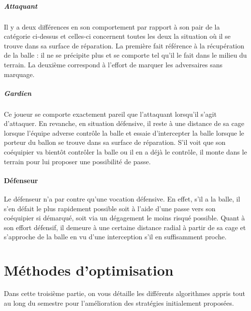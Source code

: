 \documentclass[12pt,a4paper]{article}
\begin{document}
\subsubsection*{Attaquant}
Il y a deux diff\'erences en son comportement par rapport \`a son pair 
de la cat\'egorie ci-dessus et celles-ci concernent toutes les deux la 
situation o\`u il se trouve dans sa surface de r\'eparation. La premi\`ere fait 
r\'ef\'erence \`a la r\'ecup\'eration de la balle : il ne se 
pr\'ecipite plus et se comporte tel qu'il le fait dans le milieu du terrain. La 
deuxi\`eme correspond \`a l'effort de marquer les adversaires sans 
marquage.

\subsubsection*{Gardien}
Ce joueur se comporte exactement pareil que l'attaquant lorsqu'il s'agit 
d'attaquer. En revanche, en situation d\'efensive, il reste \`a une 
distance de sa cage lorsque l'\'equipe adverse contr\^ole la balle et essaie 
d'intercepter la balle lorsque le porteur du ballon se trouve dans sa surface 
de r\'eparation. S'il voit que son co\'equipier va bient\^ot contr\^oler la 
balle ou il en a d\'ej\`a le contr\^ole, il monte dans le terrain pour lui 
proposer une possibilit\'e de passe.

\subsection*{D\'efenseur}
Le d\'efenseur n'a par contre qu'une vocation d\'efensive. En effet, s'il a la 
balle, il s'en d\'efait le plus rapidement possible soit \`a l'aide d'une passe 
vers son co\'equipier si d\'emarqu\'e, soit via un d\'egagement le moins 
risqu\'e possible. Quant \`a son effort d\'efensif, il demeure \`a une certaine 
distance radial \`a partir de sa cage et s'approche de la balle en vu d'une 
interception s'il en suffisamment proche.

\newpage

\part{M\'ethodes d'optimisation}
Dans cette troisi\`eme partie, on vous d\'etaille les diff\'erents algorithmes 
appris tout au long du semestre pour l'am\'elioration des strat\'egies 
initialement propos\'ees.
\end{document}
